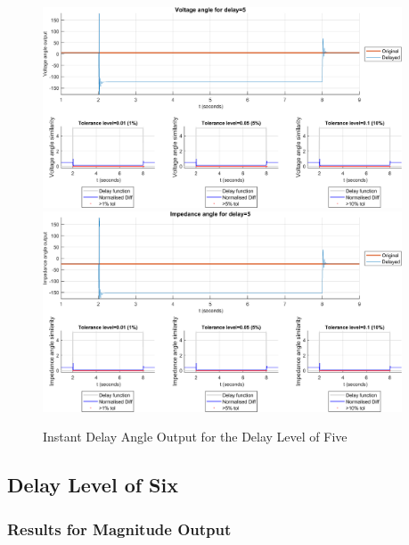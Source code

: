 \begin{figure}
    \caption{Instant Delay Angle Output for the Delay Level of Five}
    \includegraphics[width=0.95\textwidth]{PMUsim-figures/DelayOf_5/Instant_vAngle.png}    
    \includegraphics[width=0.95\textwidth]{PMUsim-figures/DelayOf_5/Instant_iAngle.png}    
    \label{fig:PMUsim_Five_Angle}
        \begin{small}
     \end{small}
\end{figure}

\newpage \subsection{Delay Level of Six}
\subsubsection{Results for Magnitude Output}

